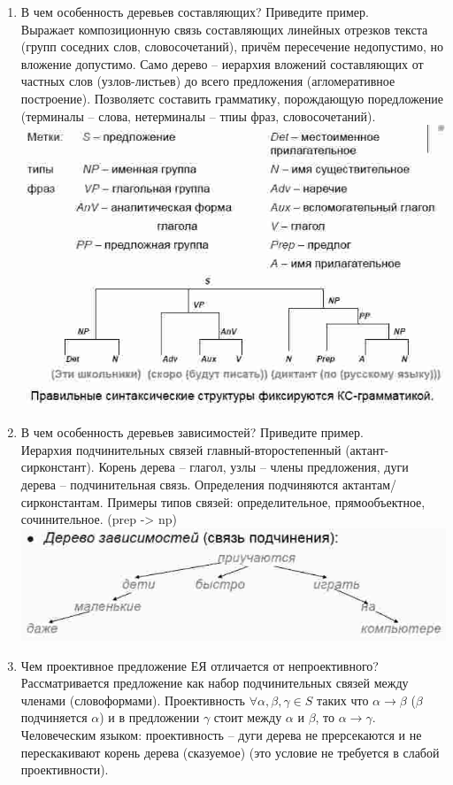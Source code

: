 \documentclass[a4paper]{article}
\begin{document}
\begin{enumerate}
	\item В чем особенность деревьев составляющих? Приведите пример.\hfill\\
	Выражает композиционную связь составляющих линейных отрезков текста (групп соседних слов, словосочетаний), причём пересечение недопустимо, но вложение допустимо. Само дерево -- иерархия вложений составляющих от частных слов (узлов-листьев) до всего предложения (агломеративное построение). Позволяетс составить грамматику, порождающую поредложение (терминалы -- слова, нетерминалы -- тпиы фраз, словосочетаний).\hfill\\
	\includegraphics[scale=0.5]{constituent_tree}

	\item В чем особенность деревьев зависимостей? Приведите пример.\hfill\\
	Иерархия подчинительных связей главный-второстепенный (актант-сирконстант). Корень дерева -- глагол, узлы -- члены предложения, дуги дерева -- подчинительная связь. Определения подчиняются актантам/сирконстантам. Примеры типов связей: определительное, прямообъектное, сочинительное. (prep -> np)\hfill\\
	\includegraphics[scale=0.5]{subordination_tree}

	\item Чем проективное предложение ЕЯ отличается от непроективного?\hfill\\
	Рассматривается предложение как набор подчинительных связей между членами (словоформами). Проективность $\forall \alpha, \beta, \gamma \in S$ таких что $\alpha\to \beta$ ($\beta$ подчиняется $\alpha$) и в предложении $\gamma$ стоит между $\alpha$ и $\beta$, то $\alpha\to\gamma$. Человеческим языком: проективность -- дуги дерева не прерсекаются и не перескакивают корень дерева (сказуемое) (это условие не требуется в слабой проективности).


\end{enumerate}
\end{document}
